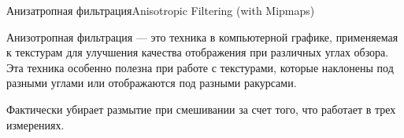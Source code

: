 \documentclass{beamer}
\begin{document}
	\begin{frame}{Анизатропная фильтрация}{Anisotropic Filtering (with Mipmaps)}


		
		Анизотропная фильтрация --- это техника в компьютерной графике, применяемая к текстурам для улучшения качества отображения при различных углах обзора. Эта техника особенно полезна при работе с текстурами, которые наклонены под разными углами или отображаются под разными ракурсами.
		
		Фактически убирает размытие при смешивании за счет того, что работает в трех измерениях.
		
		
		
		
		
	


	\end{frame}
\end{document}

